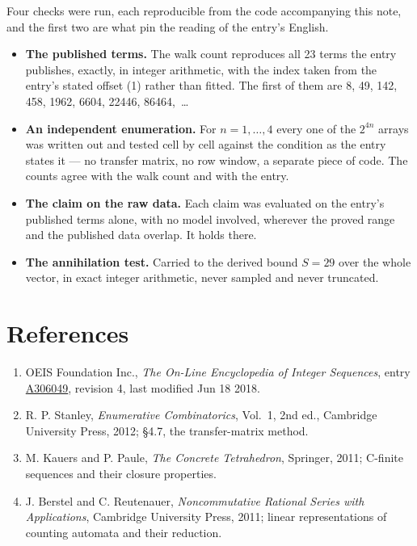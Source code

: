 \documentclass[11pt]{article}
\theoremstyle{definition}
\begin{document}
Four checks were run, each reproducible from the code accompanying this note, and the first two are what pin the reading of the entry's English.

\begin{itemize}

\item {\bfseries The published terms.} The walk count reproduces all 23 terms the entry publishes, exactly, in integer arithmetic, with the index taken from the entry's stated offset (1) rather than fitted. The first of them are 8, 49, 142, 458, 1962, 6604, 22446, 86464,~\dots

\item {\bfseries An independent enumeration.} For $n = 1,\dots,4$ every one of the $2^{4n}$ arrays was written out and tested cell by cell against the condition as the entry states it --- no transfer matrix, no row window, a separate piece of code. The counts agree with the walk count and with the entry.

\item {\bfseries The claim on the raw data.} Each claim was evaluated on the entry's published terms alone, with no model involved, wherever the proved range and the published data overlap. It holds there.

\item {\bfseries The annihilation test.} Carried to the derived bound $S = 29$ over the whole vector, in exact integer arithmetic, never sampled and never truncated.

\end{itemize}

\section{References}

\begin{enumerate}

\item OEIS Foundation Inc., \emph{The On-Line Encyclopedia of Integer Sequences}, entry \href{https://oeis.org/A306049}{A306049}, revision 4, last modified Jun 18 2018.

\item R. P. Stanley, \emph{Enumerative Combinatorics}, Vol.~1, 2nd ed., Cambridge University Press, 2012; \S4.7, the transfer-matrix method.

\item M. Kauers and P. Paule, \emph{The Concrete Tetrahedron}, Springer, 2011; C-finite sequences and their closure properties.

\item J. Berstel and C. Reutenauer, \emph{Noncommutative Rational Series with Applications}, Cambridge University Press, 2011; linear representations of counting automata and their reduction.

\end{enumerate}
\end{document}
